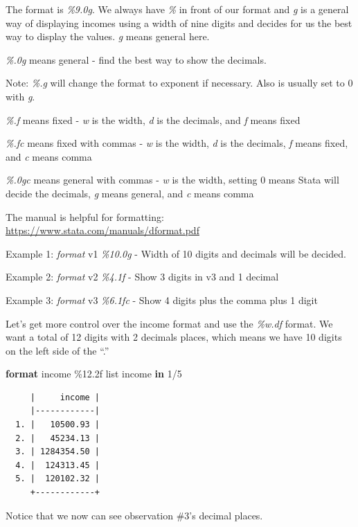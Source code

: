 \documentclass[
]{book}
\newenvironment{Shaded}{\begin{snugshade}}{\end{snugshade}}
\newcommand{\KeywordTok}[1]{\textcolor[rgb]{0.13,0.29,0.53}{\textbf{#1}}}
\newcommand{\NormalTok}[1]{#1}
\newcommand{\OtherTok}[1]{\textcolor[rgb]{0.56,0.35,0.01}{#1}}
\begin{document}
The format is \emph{\%9.0g}. We always have \emph{\%} in front of our format and \emph{g} is a general way of displaying incomes using a width of nine digits and decides for us the best way to display the values. \emph{g} means general here.

\emph{\%.0g} means general - find the best way to show the decimals.

Note: \emph{\%.g} will change the format to exponent if necessary. Also \emph{} is usually set to 0 with \emph{g}.

\emph{\%.f} means fixed - \emph{w} is the width, \emph{d} is the decimals, and \emph{f} means fixed

\emph{\%.fc} means fixed with commas - \emph{w} is the width, \emph{d} is the decimals, \emph{f} means fixed, and \emph{c} means comma

\emph{\%.0gc} means general with commas - \emph{w} is the width, setting 0 means Stata will decide the decimals, \emph{g} means general, and \emph{c} means comma

The manual is helpful for formatting: \url{https://www.stata.com/manuals/dformat.pdf}

Example 1: \emph{format} v1 \emph{\%10.0g} - Width of 10 digits and decimals will be decided.

Example 2: \emph{format} v2 \emph{\%4.1f} - Show 3 digits in v3 and 1 decimal

Example 3: \emph{format} v3 \emph{\%6.1fc} - Show 4 digits plus the comma plus 1 digit

Let's get more control over the income format and use the \emph{\%w.df} format. We want a total of 12 digits with 2 decimals places, which means we have 10 digits on the left side of the ``.''

\begin{Shaded}
\begin{Highlighting}[]
\KeywordTok{format}\NormalTok{ income \%12.2f}
\OtherTok{list}\NormalTok{ income }\KeywordTok{in}\NormalTok{ 1/5}
\end{Highlighting}
\end{Shaded}

\begin{verbatim}
     |     income |
     |------------|
  1. |   10500.93 |
  2. |   45234.13 |
  3. | 1284354.50 |
  4. |  124313.45 |
  5. |  120102.32 |
     +------------+
\end{verbatim}

Notice that we now can see observation \#3's decimal places.
\end{document}
